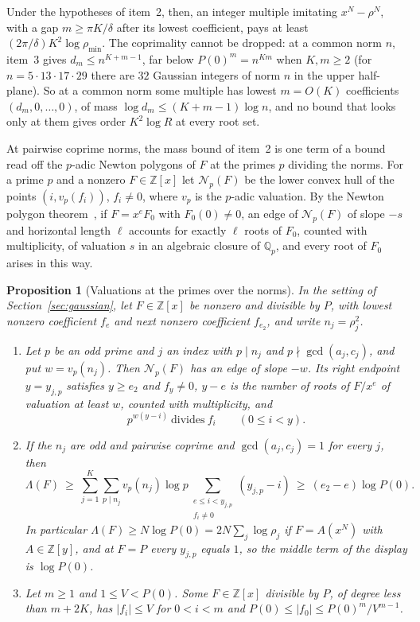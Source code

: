 \documentclass[11pt]{article}
\newtheorem{proposition}[theorem]{Proposition}
\begin{document}
Under the hypotheses of item~2, then, an integer multiple imitating $x^N-\rho^N$,
with a gap $m\ge\pi K/\delta$ after its lowest coefficient, pays at least
$(2\pi/\delta)K^2\log\rho_{\min}$.  The coprimality cannot be dropped: at a
common norm $n$, item~3 gives $d_m\le n^{K+m-1}$, far below
$P(0)^m=n^{Km}$ when $K,m\ge2$ (for $n=5\cdot13\cdot17\cdot29$ there are $32$
Gaussian integers of norm $n$ in the upper half-plane).  So at a common norm
some multiple has lowest $m=O(K)$ coefficients $(d_m,0,\ldots,0)$, of mass
$\log d_m\le(K+m-1)\log n$, and no bound that looks only at them gives order
$K^2\log R$ at every root set.

At pairwise coprime norms, the mass bound of item~2 is one term of a bound
read off the $p$-adic Newton polygons of $F$ at the primes $p$ dividing the norms.  For a
prime $p$ and a nonzero $F\in\mathbb Z[x]$ let $\mathcal N_p(F)$ be the lower
convex hull of the points $(i,v_p(f_i))$, $f_i\ne0$, where $v_p$ is the
$p$-adic valuation.  By the Newton polygon
theorem~\cite[Chapter~II, Proposition~6.3]{neukirch}, if
$F=x^eF_0$ with $F_0(0)\ne0$, an edge of $\mathcal N_p(F)$ of slope $-s$ and
horizontal length $\ell$ accounts for exactly $\ell$ roots of $F_0$, counted
with multiplicity, of valuation $s$ in an algebraic closure of $\mathbb Q_p$,
and every root of $F_0$ arises in this way.

\begin{proposition}[Valuations at the primes over the norms]\label{prop:gaussadic}
In the setting of Section~\ref{sec:gaussian}, let $F\in\mathbb Z[x]$ be nonzero
and divisible by $P$, with lowest nonzero coefficient $f_e$ and next nonzero
coefficient $f_{e_2}$, and write $n_j=\rho_j^2$.
\begin{enumerate}
\item Let $p$ be an odd prime and $j$ an index with $p\mid n_j$ and
$p\nmid\gcd(a_j,c_j)$, and put $w=v_p(n_j)$.  Then $\mathcal N_p(F)$ has an
edge of slope $-w$.  Its right endpoint $y=y_{j,p}$ satisfies $y\ge e_2$ and
$f_y\ne0$, $y-e$ is the number of roots of $F/x^e$ of valuation at least $w$,
counted with multiplicity, and
\[
  p^{w(y-i)}\ \text{divides}\ f_i\qquad(0\le i<y).
\]
\item If the $n_j$ are odd and pairwise coprime and $\gcd(a_j,c_j)=1$ for
every $j$, then
\[
  \Lambda(F)\ \ge\ \sum_{j=1}^K\sum_{p\mid n_j}v_p(n_j)\log p
  \sum_{\substack{e\le i<y_{j,p}\\ f_i\ne0}}(y_{j,p}-i)
  \ \ge\ (e_2-e)\log P(0).
\]
In particular $\Lambda(F)\ge N\log P(0)=2N\sum_j\log\rho_j$ if $F=A(x^N)$
with $A\in\mathbb Z[y]$, and at $F=P$ every $y_{j,p}$ equals $1$, so the
middle term of the display is $\log P(0)$.
\item Let $m\ge1$ and $1\le V<P(0)$.  Some $F\in\mathbb Z[x]$ divisible by $P$,
of degree less than $m+2K$, has $|f_i|\le V$ for $0<i<m$ and
$P(0)\le|f_0|\le P(0)^m/V^{m-1}$.
\end{enumerate}
\end{proposition}
\end{document}
